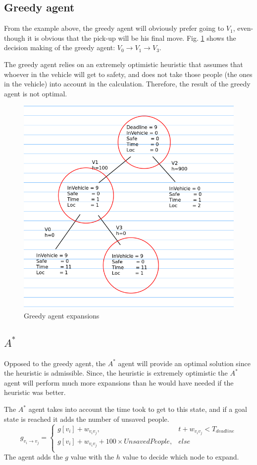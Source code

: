 \documentclass{article}                     %
\begin{document}
	
	\subsection{Greedy agent}
	From the example above, the greedy agent will obviously prefer going to $ V_1 $, even-though it is obvious that the pick-up will be his final move. Fig. \ref{fig:q2a} shows the decision making of the greedy agent: $ V_0 \rightarrow V_1 \rightarrow V_3 $.
	
	The greedy agent relies on an extremely optimistic heuristic that assumes that whoever in the vehicle will get to safety, and does not take those people (the ones in the vehicle) into account in the calculation. Therefore, the result of the greedy agent is not optimal.
	
	\begin{figure}
		\centering
		\includegraphics[width=0.5\linewidth]{q2a}
		\caption{Greedy agent expansions}
		\label{fig:q2a}
	\end{figure}
	
	
	\subsection{$ A^* $}
	Opposed to the greedy agent, the $ A^* $ agent will provide an optimal solution since the heuristic is admissible. Since, the heuristic is extremely optimistic the $ A^* $ agent will perform much more expansions than he would have needed if the heuristic was better.
	
	The $ A^* $ agent takes into account the time took to get to this state, and if a goal state is reached it adds the number of unsaved  people.
	\begin{equation}\label{eq:g_val}
		g_{v_i\rightarrow v_j}=
		\begin{cases}
		g[v_i] + w_{v_iv_j},& t + w_{v_iv_j} < T_{deadline}\\
		g[v_i] + w_{v_iv_j} + 100\times UnsavedPeople,& else\\
		\end{cases}
	\end{equation} 
	The agent adds the $ g $ value with the $ h $ value to decide which node to expand.
	
\end{document}
